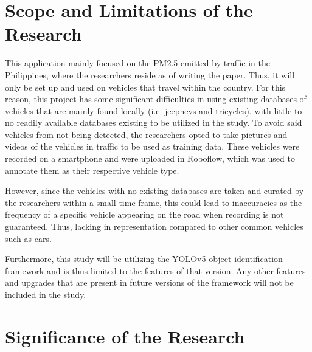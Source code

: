 \section{Scope and Limitations of the Research}
\label{sec:scopelimitations}
This application mainly focused on the PM2.5 emitted by traffic in the Philippines, where the researchers reside as of writing the paper. Thus, it will only be set up and used on vehicles that travel within the country. For this reason, this project has some significant difficulties in using existing databases of vehicles that are mainly found locally (i.e. jeepneys and tricycles), with little to no readily available databases existing to be utilized in the study. To avoid said vehicles from not being detected, the researchers opted to take pictures and videos of the vehicles in traffic to be used as training data. These vehicles were recorded on a smartphone and were uploaded in Roboflow, which was used to annotate them as their respective vehicle type. 

However, since the vehicles with no existing databases are taken and curated by the researchers within a small time frame, this could lead to inaccuracies as the frequency of a specific vehicle appearing on the road when recording is not guaranteed. Thus, lacking in representation compared to other common vehicles such as cars.

Furthermore, this study will be utilizing the YOLOv5 object identification framework and is thus limited to the features of that version. Any other features and upgrades that are present in future versions of the framework will not be included in the study. 



\begin{comment}

%
%
Generally, one paragraph should be allotted for each of your research objectives.

Each paragraph contains a brief overview of the concept/theory and the purpose of doing the associated objective.

Each paragraph also includes a description of the scope/limitation of your study.

* Please refer to the slides for examples.

\end{comment}


\section{Significance of the Research}
\label{sec:significance}

